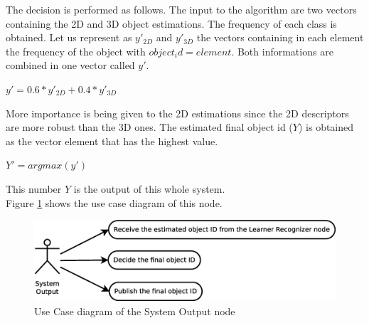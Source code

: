 	The decision is performed as follows. 
	The input to the algorithm are two vectors containing the 2D and 3D object estimations. 
	The frequency of each class is obtained. 
	Let us represent as $y'_{2D}$ and $y'_{3D}$ the vectors containing in each element the frequency of the object with $object_id = element$. 
	Both informations are combined in one vector called $y'$. 
	\\
	\begin{center}
	$y'=0.6*y'_{2D}+0.4*y'_{3D}$
	\end{center}
	More importance is being given to the 2D estimations since the 2D descriptors are more robust than the 3D ones. 
	The estimated final object id ($Y$) is obtained as the vector element that has the highest value. 
	\\
	\begin{center}
		$Y'= argmax(y')$
	\end{center} 
	This number $Y$ is the output of this whole system. 
	\\
	Figure \ref{uc_output} shows the use case diagram of this node. 

	\begin{figure}[H]
		\centering
			\includegraphics[scale=0.4]{img/diagrams/uc_system_output.eps}
			\caption[Use case diagram System Output node]{Use Case diagram of the System Output node}
			\label{uc_output}
	\end{figure}